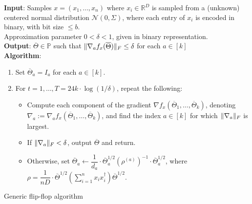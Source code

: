 \documentclass[aos]{imsart}
\theoremstyle{definition}
\numberwithin{equation}{section}
\DeclarePairedDelimiter{\norm}{\lVert}{\rVert}
\newcommand{\R}{{\mathbb{R}}}
\newcommand{\otheta}{\overline{\Theta}}
\newcommand{\eps}{\varepsilon}
\newcommand{\cN}{\mathcal{N}}
\newcommand{\SPD}{\mathbb{P}}
\newcommand{\samp}{x}
\def\dmax{d_{\max}}
\begin{document}
\begin{Algorithm}
\textbf{Input}: Samples $\samp = (\samp_1, \ldots, \samp_n)$ where $\samp_i \in \R^D$ is sampled from a (unknown) centered normal distribution $\cN(0, \Sigma)$, where each entry of $\samp_i$ is encoded in binary, with bit size $\le b$. \\ Approximation parameter $0 < \delta < 1$, given in binary representation. \\[.3ex]

\textbf{Output}: $\otheta \in \SPD$ such that $\norm{\nabla_a f_x(\otheta)}_F \leq \delta$ for each $a \in [k]$ \\[.3ex]

\textbf{Algorithm}:
\begin{enumerate}
\item\label{it:flip-flop step 1} Set $\otheta_a = I_a$ for each $a \in [k]$. 

\vspace{5pt}

\item\label{it:flip-flop step 2} For $t=1,\dots,T = 24 k \cdot \log(1/\delta)$, repeat the following:

\vspace{5pt}

\begin{itemize}
\item Compute each component of the gradient $\nabla f_{\samp}(\otheta_1, \ldots, \otheta_k)$, denoting $\nabla_a := \nabla_a f_{\samp}(\otheta_1, \ldots, \otheta_k)$, and find the index $a \in [k]$ for which $\norm{\nabla_a}_F$ is largest.

\vspace{5pt}

\item
If $\norm{\nabla_a}_F < \delta$, output $\otheta$ and return.

\vspace{5pt}

\item Otherwise, set $\otheta_a \leftarrow  \dfrac{1}{d_a} \cdot \otheta_a^{1/2} (\rho^{(a)})^{-1} \cdot \otheta_a^{1/2}$, where $\rho = \dfrac{1}{nD} \cdot  \otheta^{1/2} \left( \sum_{i=1}^n x_ix_i^\dagger \right) \otheta^{1/2}.$
\end{itemize}
\end{enumerate}
\caption{Generic flip-flop algorithm}\label{alg:flip-flop}
\end{Algorithm}
\end{document}
